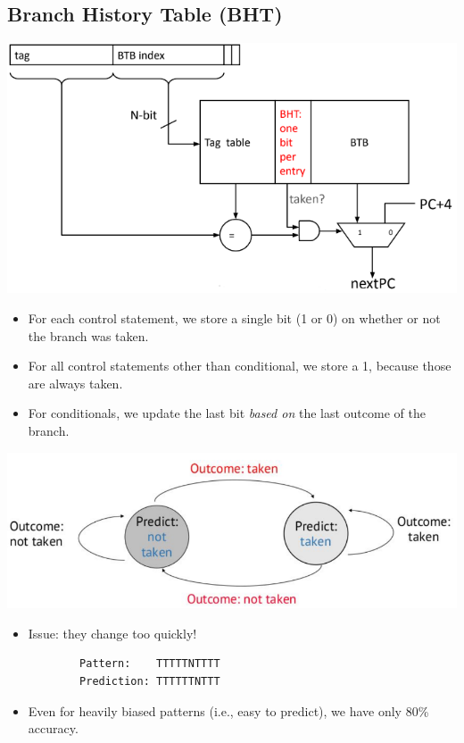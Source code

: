 \documentclass[10pt]{article}
\begin{document}
\subsection*{Branch History Table (BHT)}
\begin{center}
    \includegraphics*[scale=0.8]{W4_6.png}
\end{center}
\begin{itemize}
    \item For each control statement, we store a single bit (1 or 0) on whether or not the branch was taken.
    \item For all control statements other than conditional, we store a 1, because those are always taken.
    \item For conditionals, we update the last bit \textit{based on} the last outcome of the branch.
\end{itemize}
\begin{center}
    \includegraphics*[scale=0.8]{W4_7.png}
\end{center}
\begin{itemize}
    \item Issue: they change too quickly!
    \begin{verbatim}
        Pattern:    TTTTTNTTTT
        Prediction: TTTTTTNTTT
    \end{verbatim}
    \item Even for heavily biased patterns (i.e., easy to predict), we have only 80\% accuracy.
\end{itemize}
\end{document}
